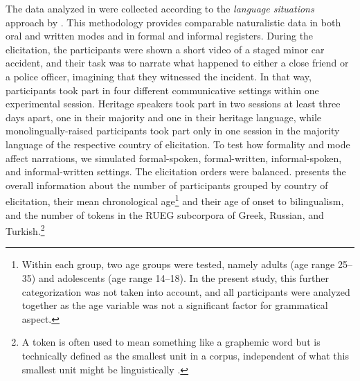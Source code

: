 \documentclass[output=paper,colorlinks,citecolor=brown]{langscibook}
\begin{document}
The data analyzed in \textcite{RizouEtAl} 
were collected according to the \textit{language situations} approach by \textcite{wiese2020language}. This methodology provides comparable naturalistic data in both oral and written modes and in formal and informal registers. During the elicitation, the participants were shown a short video of a staged minor car accident, and their task was to narrate what happened to either a close friend or a police officer, imagining that they witnessed the incident. In that way, participants took part in four different communicative settings within one experimental session. Heritage speakers took part in two sessions at least three days apart, one in their majority and one in their heritage language, while monolingually-raised
participants took part only in one session in the majority language of the respective country of elicitation. To test how formality and mode affect narrations, we simulated formal-spoken, formal-written, informal-spoken, and
informal-written settings. The elicitation orders were balanced. 
 presents the overall information about the number of participants grouped by country of elicitation, their mean chronological age\footnote{Within each group, two age groups were tested, namely adults (age range 25--35) and adolescents (age range 14--18). In the present study, this further categorization was not taken into account, and all participants were analyzed together as the age variable was not a significant factor for grammatical aspect.} and their age of onset to bilingualism, and the number of tokens in the RUEG subcorpora of Greek, Russian, and Turkish.\footnote{A token is often used to mean something like a graphemic word but is technically defined as the smallest unit in a corpus, independent of what this smallest unit might be linguistically \parencite{schmid2008tokenizing, sauer2016flexible}.}
\end{document}
